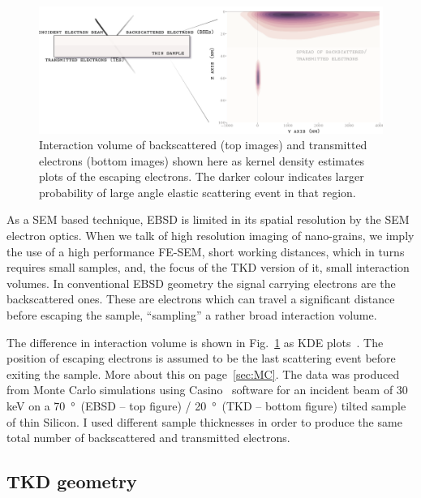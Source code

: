 \begin{figure}[ht]
\centering
\includegraphics[width=1.1\linewidth]{Figures/TKDpendepth.png}
\caption[Interaction volume]{Interaction volume of backscattered (top images) and transmitted electrons (bottom images) shown here as kernel density estimates plots of the escaping electrons. The darker colour indicates larger probability of large angle elastic scattering event in that region.}
\label{fig:intvolume}
\end{figure}



As a SEM based technique, EBSD is limited in its spatial resolution by the SEM electron optics. When we talk of high resolution imaging of nano-grains, we imply the use of a high performance FE-SEM, short working distances, which in turns requires small samples, and, the focus of the TKD version of it, small interaction volumes. In conventional EBSD geometry the signal carrying electrons are the backscattered ones. These are electrons which can travel a significant distance before escaping the sample, ``sampling'' a rather broad interaction volume. 



The difference in interaction volume is shown in Fig.~\ref{fig:intvolume} as KDE plots~\cite{KDE}. The position of escaping electrons is assumed to be the last scattering event before exiting the sample. More about this on page~\ref{sec:MC}. The data was produced from Monte Carlo simulations using Casino~\cite{casino} software for an incident beam of 30 keV on a \SI{70}{\degree}~(EBSD -- top figure) / \SI{20}{\degree}~(TKD -- bottom figure) tilted sample of thin Silicon. I used different sample thicknesses in order to produce the same total number of backscattered and transmitted electrons.









\subsection{TKD geometry}

